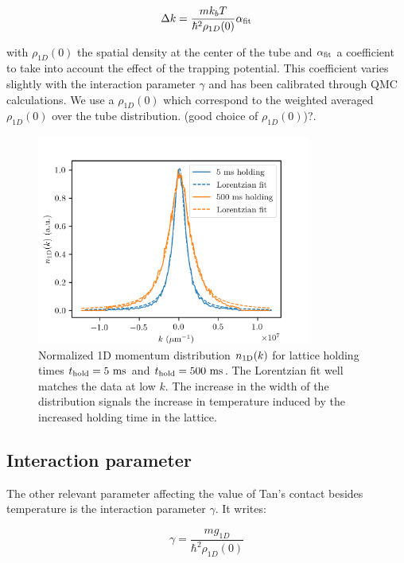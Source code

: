 \begin{equation}
    \Delta k=\frac{m k_b T}{\hbar^2 \rho_{1D}(0)} \alpha_{\rm{fit}}
\end{equation}

\noindent with $\rho_{1D}(0)$ the spatial density at the center of the tube and $\alpha_{\rm{fit}}$ a coefficient to take into account the effect of the trapping potential. This coefficient varies slightly with the interaction parameter $\gamma$ and has been calibrated through QMC calculations. We use a $\rho_{1D}(0)$ which correspond to the weighted averaged $\rho_{1D}(0)$ over the tube distribution. {\color{blue}(good choice of $\rho_{1D}(0)$)?}.

\begin{figure}
    \centering
    \includegraphics[width=0.8\textwidth]{Fig/Chapter5/1D_temperature_lorentz.png}
    \caption{Normalized 1D momentum distribution $n_{\rm{1D}} (k)$ for lattice holding times $t_{\rm{hold}}=5 \ \rm{ms}$ and $t_{\rm{hold}}=500 \ \rm{ms}$. The Lorentzian fit well matches the data at low $k$. The increase in the width of the distribution signals the increase in temperature induced by the increased holding time in the lattice.}
    \label{fig:1D_temperature}
\end{figure}


\subsection{Interaction parameter}

The other relevant parameter affecting the value of Tan's contact besides temperature is the interaction parameter $\gamma$. It writes:

\begin{equation}
    \gamma = \frac{m g_{1D}}{\hbar^2 \rho_{1D}(0)}
    \label{eq:gamma}
\end{equation}


